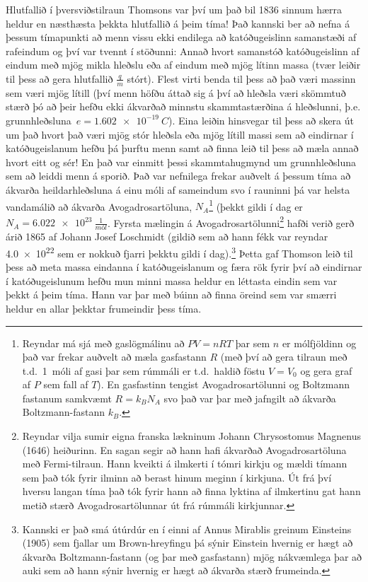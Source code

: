 Hlutfallið í þversviðstilraun Thomsons var því um það bil 1836 sinnum hærra heldur en næsthæsta þekkta hlutfallið á þeim tíma! Það kannski ber að nefna á þessum tímapunkti að menn vissu ekki endilega að katóðugeislinn samanstæði af rafeindum og því var tvennt í stöðunni: Annað hvort samanstóð katóðugeislinn af eindum með mjög mikla hleðslu eða af eindum með mjög lítinn massa (tvær leiðir til þess að gera hlutfallið $\frac{q}{m}$ stórt). Flest virti benda til þess að það væri massinn sem væri mjög lítill (því menn höfðu áttað sig á því að hleðsla væri skömmtuð stærð þó að þeir hefðu ekki ákvarðað minnstu skammtastærðina á hleðslunni, þ.e. grunnhleðsluna~$e = \SI{1.602e-19}{C}$). Eina leiðin hinsvegar til þess að skera út um það hvort það væri mjög stór hleðsla eða mjög lítill massi sem að eindirnar í katóðugeislanum hefðu þá þurftu menn samt að finna leið til þess að mæla annað hvort eitt og sér! En það var einmitt þessi skammtahugmynd um grunnhleðsluna sem að leiddi menn á sporið. Það var nefnilega frekar auðvelt á þessum tíma að ákvarða heildarhleðsluna á einu móli af sameindum svo í rauninni þá var helsta vandamálið að ákvarða Avogadrosartöluna, $N_A$\footnote{Reyndar má sjá með gaslögmálinu að $PV = nRT$ þar sem $n$ er mólfjöldinn og það var frekar auðvelt að mæla gasfastann $R$ (með því að gera tilraun með t.d.~\SI{1}{móli} af gasi þar sem rúmmáli er t.d.~haldið föstu $V = V_0$ og gera graf af $P$ sem fall af $T$). En gasfastinn tengist Avogadrosartölunni og Boltzmann fastanum samkvæmt $R = k_B N_A$ svo það var þar með jafngilt að ákvarða Boltzmann-fastann $k_B$.} (þekkt gildi í dag er $N_A = \SI[per-mode=fraction]{6.022e23}{\frac{1}{mól}}$. Fyrsta mælingin á Avogadrosartölunni\footnote{Reyndar vilja sumir eigna franska lækninum Johann Chrysostomus Magnenus (1646) heiðurinn. En sagan segir að hann hafi ákvarðað Avogadrosartöluna með Fermi-tilraun. Hann kveikti á ilmkerti í tómri kirkju og mældi tímann sem það tók fyrir ilminn að berast hinum meginn í kirkjuna. Út frá því hversu langan tíma það tók fyrir hann að finna lyktina af ilmkertinu gat hann metið stærð Avogadrosartölunnar út frá rúmmáli kirkjunnar.} hafði verið gerð árið 1865 af Johann Josef Loschmidt (gildið sem að hann fékk var reyndar \SI{4.0e22}{} sem er nokkuð fjarri þekktu gildi í dag).\footnote{Kannski er það smá útúrdúr en í einni af Annus Mirablis greinum Einsteins (1905) sem fjallar um Brown-hreyfingu þá sýnir Einstein hvernig er hægt að ákvarða Boltzmann-fastann (og þar með gasfastann) mjög nákvæmlega þar að auki sem að hann sýnir hvernig er hægt að ákvarða stærð frumeinda.} Þetta gaf Thomson leið til þess að meta massa eindanna í katóðugeislanum og færa rök fyrir því að eindirnar í katóðugeislunum hefðu mun minni massa heldur en léttasta eindin sem var þekkt á þeim tíma. Hann var þar með búinn að finna öreind sem var smærri heldur en allar þekktar frumeindir þess tíma. \\

